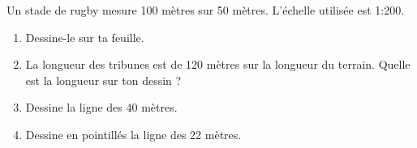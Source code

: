 
Un stade de rugby mesure 100 mètres sur 50 mètres. L'échelle utilisée est 1:200.
\begin{enumerate}
\item Dessine-le sur ta feuille.
\item La longueur des tribunes est de 120 mètres sur la longueur du terrain. Quelle est la longueur sur ton dessin ?
\item Dessine la ligne des 40 mètres.
\item Dessine en pointillés la ligne des 22 mètres.
\end{enumerate}
